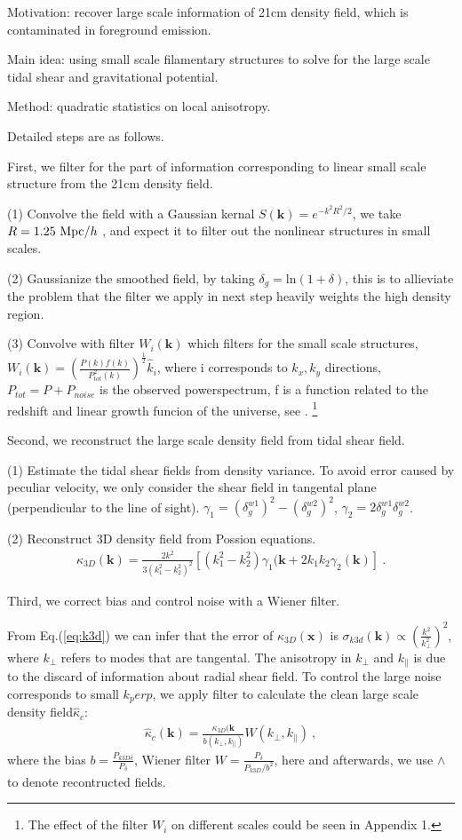 Motivation: recover large scale information of 21cm density field, 
which is contaminated in foreground emission.

Main idea: using small scale filamentary structures to solve for the large scale tidal shear and gravitational potential. 

Method: quadratic statistics on local anisotropy.

Detailed steps are as follows.

First, we filter for the part of information corresponding to linear small scale structure from the 21cm density field.

(1) Convolve the field with a Gaussian kernal
$S(\bm{k})=e^{-k^2R^2/2}$, 
we take $R=1.25\ \mathrm{Mpc}/h$ \cite{2012:pen}\cite{2015:zhu},
and expect it to filter out the nonlinear structures in small scales.

(2) Gaussianize the smoothed field, by taking 
$\delta_g=\mathrm{ln}(1+\delta)$, 
this is to allieviate the problem that the filter we apply in next step heavily weights the high density region.

(3) Convolve with filter $W_i(\bm{k})$ which filters for the small scale structures, 
$W_i(\bm{k})=(\frac{P(k)f(k)}{P_{tot}^2(k)})^{\frac{1}{2}}\hat{k}_i$,
where i corresponds to $k_x,k_y$ directions, $P_{tot}=P+P_{noise}$ is the observed powerspectrum, f is a function related to the redshift and linear growth funcion of the universe, see 
\cite{2015:zhu}.
\footnote{The effect of the filter $W_i$ on different scales could be seen in Appendix 1.}

Second, we reconstruct the large scale density field from tidal shear field.

(1) Estimate the tidal shear fields from density variance.
To avoid error caused by peculiar velocity, we only consider the shear field in tangental plane
(perpendicular to the line of sight).
$\gamma_1=(\delta_g^{w1})^2-(\delta_g^{w2})^2$,
$\gamma_2=2\delta_g^{w1}\delta_g^{w2}$.

(2) Reconstruct 3D density field from Possion equations.
\begin{eqnarray}
\label{eq:k3d}
\kappa_{3D}(\bm{k})=\frac{2k^2}{3(k_1^2-k_2^2)^2}[(k_1^2-k_2^2)\gamma_1(\bm{k}+2k_1k_2\gamma_2(\bm{k})]\ .
\end{eqnarray}

Third, we correct bias and control noise with a Wiener filter.

From Eq.(\ref{eq:k3d}) we can infer that the error of $\kappa_{3D}(\bm{x})$ is 
$\sigma_{k3d}(\bm{k})\propto(\frac{k^2}{k_\perp^2})^2$, where $k_\perp$ refers to modes that are tangental.
The anisotropy in $k_\perp$ and $k_\parallel$ is due to the discard of information about radial shear field.
To control the large noise corresponds to small $k_perp$, we apply filter to calculate the clean large scale density field$\hat \kappa_c$:
\begin{eqnarray}
	\label{eq:wiener}
\hat \kappa_{c}(\bm{k})=\frac{\kappa_{3D}(\bm{k}}{b(k_\perp,k_\parallel)}W(k_\perp,k_\parallel)\ ,
\end{eqnarray}
where the bias $b=\frac{P_{k3D \delta}}{P_\delta}$, Wiener filter $W=\frac{P_\delta}{P_{k3D}/b^2}$, here and afterwards, 
we use $\wedge$ to denote recontructed fields.

